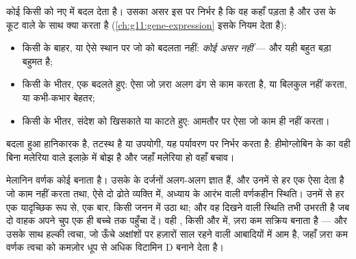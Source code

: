 \begin{proposition}[अनुक्रम से लक्षणप्ररूप तक]\label{prop:g11:mutations:consequences}
कोई  किसी  को नए  में बदल देता है। उसका असर इस
पर निर्भर है कि वह कहाँ पड़ता है और उस  के कूट वाले  के साथ क्या
करता है (\cref{ch:g11:gene-expression} इसके नियम देता है):
\begin{itemize}
  \item किसी  के बाहर, या ऐसे स्थान पर जो  को बदलता नहीं:
        \emph{कोई असर नहीं} --- और यही बहुत बड़ा बहुमत है;
  \item किसी  के भीतर, एक  बदलते हुए: ऐसा  जो ज़रा
        अलग ढंग से काम करता है, या बिलकुल नहीं करता, या कभी-कभार बेहतर;
  \item किसी  के भीतर, संदेश को खिसकाते या काटते हुए: आमतौर पर ऐसा
         जो काम ही नहीं करता।
\end{itemize}
बदला हुआ  हानिकारक है, तटस्थ है या उपयोगी, यह पर्यावरण पर निर्भर
करता है: हीमोग्लोबिन के  का वही  बिना मलेरिया वाले इलाक़े में
बोझ है और जहाँ मलेरिया हो वहाँ बचाव।
\end{proposition}
\admitted

\begin{example}[वर्णक खोया, वर्णक बचा]\label{ex:g11:mutations:pigment}
मेलानिन वर्णक कोई  बनाता है। उसके  के दर्जनों अलग-अलग
 ज्ञात हैं, और उनमें से हर एक ऐसा  देता है जो काम नहीं
करता तथा, ऐसे दो  ढोते व्यक्ति में, अध्याय के आरंभ वाली वर्णकहीन
स्थिति। उनमें से हर एक यादृच्छिक रूप से, एक बार, किसी जनन  में उठा
था; और वह दिखने वाली स्थिति तभी उभरती है जब दो वाहक अपने चुप  एक ही
बच्चे तक पहुँचा दें। वही , किसी और  में, ज़रा कम सक्रिय 
बनाता है --- और उसके साथ हल्की त्वचा, जो ऊँचे अक्षांशों पर हज़ारों साल
रहने वाली आबादियों में आम है, जहाँ ज़रा कम वर्णक त्वचा को कमज़ोर धूप से
अधिक विटामिन D बनाने देता है।
\end{example}

